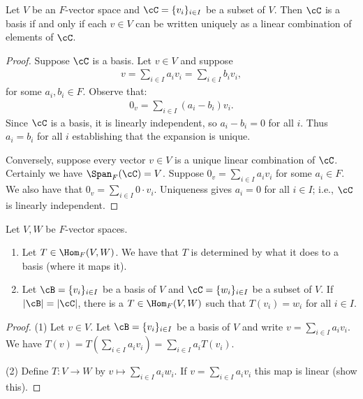     \begin{lemma}
        Let $V$ be an $F$-vector space and $\cC = \{v_i\}_{i \in I}$ be a subset of $V$. Then $\cC$ is a basis if and only if each $v \in V$ can be written uniquely as a linear combination of elements of $\cC$.
    \end{lemma}
        \begin{proof}
            Suppose $\cC$ is a basis. Let $v \in V$ and suppose 
                \begin{equation*}
                \begin{split}
                    v = \sum_{i 
                    \in I}a_i v_i = \sum_{i 
                    \in I}b_i v_i,
                \end{split}
                \end{equation*}
            for some $a_i ,b_i \in F$. Observe that:
                \begin{equation*}
                \begin{split}
                    0_v = \sum_{i \in I}(a_i - b_i)v_i.
                \end{split}
                \end{equation*}
            Since $\cC$ is a basis, it is linearly independent, so $a_i - b_i = 0$ for all $i$. Thus $a_i = b_i$ for all $i$ establishing that the expansion is unique.

            Conversely, suppose every vector $v \in V$ is a unique linear combination of $\cC$. Certainly we have $\Span_F{(\cC)} = V$. Suppose $0_v = \sum_{i \in I}a_i v_i$ for some $a_i \in F$. We also have that $0_v = \sum_{i \in I}0 \cdot v_i$. Uniqueness gives $a_i = 0$ for all $i \in I$; i.e., $\cC$ is linearly independent.
        \end{proof}
    
    \begin{proposition}\label{prop:basis-sent}
        Let $V,W$ be $F$-vector spaces.
            \begin{enumerate}[label=(\arabic*)]
                \item Let $T \in \Hom_F{(V,W)}$. We have that $T$ is determined by what it does to a basis (where it maps it).
                \item Let $\cB = \{v_i\}_{i \in I}$ be a basis of $V$ and $\cC = \{w_i\}_{i \in I}$ be a subset of $V$. If $|\cB| = |\cC|$, there is a $T \in \Hom_F{(V,W)}$ such that $T(v_i) = w_i$ for all $i \in I$.
            \end{enumerate}
    \end{proposition}
        \begin{proof}
            (1) Let $v \in V$. Let $\cB = \{v_i\}_{i \in I}$ be a basis of $V$ and write $v = \sum_{i \in I}a_i v_i$. We have $T(v) = T(\sum_{i \in I}a_i v_i) = \sum_{i \in I}a_i T(v_i)$.

            (2) Define $T:V \rightarrow W$ by $v \mapsto \sum_{i \in I}a_i w_i$. If $v = \sum_{i \in I}a_i v_i$ this map is linear {\color{red} (show this)}.
        \end{proof}
    
